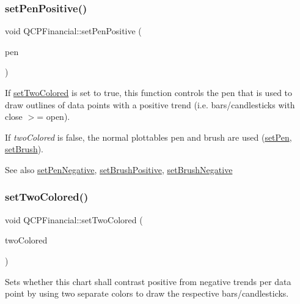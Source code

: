 \subsubsection{\texorpdfstring{set\+Pen\+Positive()}{setPenPositive()}}
{\footnotesize\ttfamily void Q\+C\+P\+Financial\+::set\+Pen\+Positive (\begin{DoxyParamCaption}\item[{const Q\+Pen \&}]{pen }\end{DoxyParamCaption})}

If \hyperlink{class_q_c_p_financial_a138e44aac160a17a9676652e240c5f08}{set\+Two\+Colored} is set to true, this function controls the pen that is used to draw outlines of data points with a positive trend (i.\+e. bars/candlesticks with close $>$= open).

If {\itshape two\+Colored} is false, the normal plottable\textquotesingle{}s pen and brush are used (\hyperlink{class_q_c_p_abstract_plottable_ab74b09ae4c0e7e13142fe4b5bf46cac7}{set\+Pen}, \hyperlink{class_q_c_p_abstract_plottable_a7a4b92144dca6453a1f0f210e27edc74}{set\+Brush}).

\begin{DoxySeeAlso}{See also}
\hyperlink{class_q_c_p_financial_afe5c07e94ccea01a75b3a2476993c346}{set\+Pen\+Negative}, \hyperlink{class_q_c_p_financial_a5ebff2b1764efd07cc44942e67821829}{set\+Brush\+Positive}, \hyperlink{class_q_c_p_financial_a8bbdd87629f9144b3ef51af660c0961a}{set\+Brush\+Negative} 
\end{DoxySeeAlso}
\mbox{\label{class_q_c_p_financial_a138e44aac160a17a9676652e240c5f08}} 
\subsubsection{\texorpdfstring{set\+Two\+Colored()}{setTwoColored()}}
{\footnotesize\ttfamily void Q\+C\+P\+Financial\+::set\+Two\+Colored (\begin{DoxyParamCaption}\item[{bool}]{two\+Colored }\end{DoxyParamCaption})}

Sets whether this chart shall contrast positive from negative trends per data point by using two separate colors to draw the respective bars/candlesticks.

